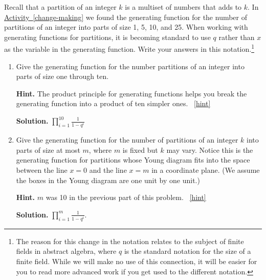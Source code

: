\documentclass{book}
\begin{document}
\setcounter{project}{317}
\addtocounter{project}{-1}
\begin{activity}[]\label{activity-310}
\hypertarget{p-1583}{}%
Recall that a partition of an integer \(k\) is a multiset of numbers that adds to \(k\). In \hyperref[change-making]{Activity~\ref{change-making}} we found the generating function for the number of partitions of an integer into parts of size 1, 5, 10, and 25. When working with generating functions for partitions, it is becoming standard to use \(q\) rather than \(x\) as the variable in the generating function.  Write your answers in this notation.\footnote{The reason for this change in the notation relates to the subject of finite fields in abstract algebra, where \(q\) is the standard notation for the size of a finite field.  While we will make no use of this connection, it will be easier for you to read more advanced work if you get used to the different notation.\label{fn-20}}%
\begin{enumerate}[font=\bfseries,label=(\alph*),ref=\alph*]
\item\label{task-271} \hypertarget{p-1584}{}%
Give the generating function for the number partitions of an integer into parts of size one through ten.%
\par\smallskip%
\noindent\textbf{Hint.}\hypertarget{hint-205}{}\quad%
\hypertarget{p-1585}{}%
The product principle for generating functions helps you break the generating function into a product of ten simpler ones.%
~\hfill{\tiny\hyperlink{a-317.a}{[hint]}\hypertarget{q-317.a}{}}\par\smallskip%
\noindent\textbf{Solution.}\hypertarget{solution-210}{}\quad%
\hypertarget{p-1586}{}%
\(\prod_{i=1}^{10}\frac{1}{1-q^i}\)%
\item\label{largestpartatmostm} \hypertarget{p-1587}{}%
Give the generating function for the number of partitions of an integer \(k\) into parts of size at most \(m\), where \(m\) is fixed but \(k\) may vary. Notice this is the generating function for partitions whose Young diagram fits into the space between the line \(x=0\) and the line \(x=m\) in a coordinate plane. (We assume the boxes in the Young diagram are one unit by one unit.)%
\par\smallskip%
\noindent\textbf{Hint.}\hypertarget{hint-206}{}\quad%
\hypertarget{p-1588}{}%
\(m\) was 10 in the previous part of this problem.%
~\hfill{\tiny\hyperlink{a-317.b}{[hint]}\hypertarget{q-317.b}{}}\par\smallskip%
\noindent\textbf{Solution.}\hypertarget{solution-211}{}\quad%
\hypertarget{p-1589}{}%
\(\prod_{i=1}^m\frac{1}{1-q^i}\).%
\end{enumerate}
\end{activity}

\clearpage
\end{document}
